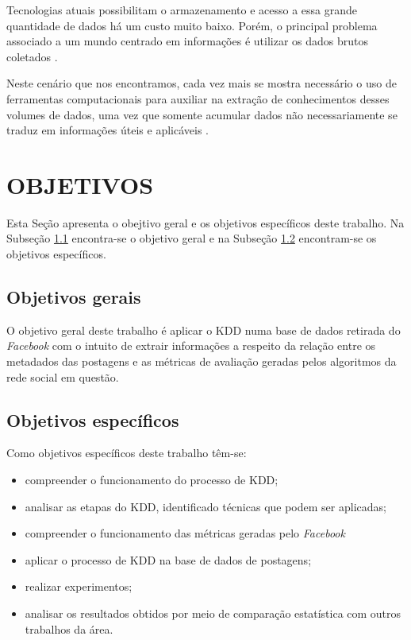 Tecnologias atuais possibilitam o armazenamento e acesso a essa grande quantidade de dados há um custo muito baixo. Porém, o principal problema associado a um mundo centrado em informações é utilizar os dados brutos coletados .

Neste cenário que nos encontramos, cada vez mais se mostra necessário o uso de ferramentas computacionais para auxiliar na extração de conhecimentos desses volumes de dados, uma vez que somente acumular dados não necessariamente se traduz em informações úteis e aplicáveis .

\section{OBJETIVOS}
\label{sec:objetivos}
Esta Seção apresenta o obejtivo geral e os objetivos específicos deste trabalho. Na Subseção \ref{subsec:objGerais} encontra-se o objetivo geral e na Subseção \ref{subsec:objEspecificos} encontram-se os objetivos específicos.

\subsection{Objetivos gerais}
\label{subsec:objGerais}
O objetivo geral deste trabalho é aplicar o KDD numa base de dados retirada do \textit{Facebook} com o intuito de extrair informações a respeito da relação entre os metadados das postagens e as métricas de avaliação geradas pelos algoritmos da rede social em questão.

\subsection{Objetivos específicos}
\label{subsec:objEspecificos}
Como objetivos específicos deste trabalho têm-se:
\begin{itemize}
	\item compreender o funcionamento do processo de KDD;
	\item analisar as etapas do KDD, identificado técnicas que podem ser aplicadas;
	\item compreender o funcionamento das métricas geradas pelo \textit{Facebook}
	\item aplicar o processo de KDD na base de dados de postagens;
	\item realizar experimentos;
	\item analisar os resultados obtidos por meio de comparação estatística com outros trabalhos da área.
\end{itemize}

